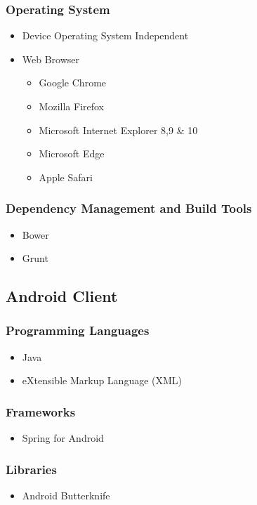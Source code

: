 \documentclass[a4paper,10pt]{article}
\begin{document}
\subsubsection{Operating System}
	\begin{itemize}
		\item Device Operating System Independent
		\item Web Browser
		\begin{itemize}
			\item Google Chrome
			\item Mozilla Firefox
			\item Microsoft Internet Explorer 8,9 \& 10
			\item Microsoft Edge
			\item Apple Safari
		\end{itemize}
	\end{itemize}

\subsubsection{Dependency Management and Build Tools}
	\begin{itemize}
		\item Bower
		\item Grunt
	\end{itemize}

\subsection{Android Client}
\subsubsection{Programming Languages}
	\begin{itemize}
		\item Java
		\item eXtensible Markup Language (XML)
	\end{itemize}

\subsubsection{Frameworks}
	\begin{itemize}
		\item Spring for Android
	\end{itemize}

\subsubsection{Libraries}
	\begin{itemize}
		\item Android Butterknife
	\end{itemize}
\end{document}
